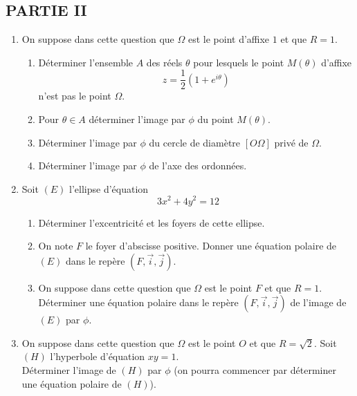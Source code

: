 \subsection*{PARTIE II}
\begin{enumerate}
\item On suppose dans cette question que $\Omega$ est le point d'affixe $1$ et que $R=1$.
\begin{enumerate}
\item Déterminer l'ensemble $A$ des réels $\theta$ pour lesquels le point 
$M(\theta)$ d'affixe $$z=\frac12(1+e^{i\theta})$$ n'est pas le point $\Omega$.
\item Pour $\theta\in A$ déterminer l'image par $\phi$ du point $M(\theta)$.
\item Déterminer l'image par $\phi$ du cercle de diamètre $[O\Omega]$ privé de $\Omega$.
\item Déterminer l'image par $\phi$ de l'axe des ordonnées.
\end{enumerate}
\item Soit $(E)$ l'ellipse d'équation $$3x^2+4y^2=12$$
\begin{enumerate}
\item Déterminer l'excentricité et les foyers de cette ellipse.
\item On note $F$ le foyer d'abscisse positive. Donner une équation polaire de $(E)$ dans le repère $(F,\vec{i},\vec{j})$.
\item On suppose dans cette question que $\Omega$ est le point $F$ et que $R=1$.\\ Déterminer une équation polaire dans le repère $(F,\vec{i},\vec{j})$ de l'image de $(E)$ par $\phi$.
\end{enumerate}
\item On suppose dans cette question que $\Omega$ est le point $O$ et que $R=\sqrt{2}$. Soit $(H)$ l'hyperbole d'équation $xy=1$.\\ Déterminer l'image de $(H)$ par $\phi$ (on pourra commencer par déterminer une équation polaire de $(H)$).
\end{enumerate}
